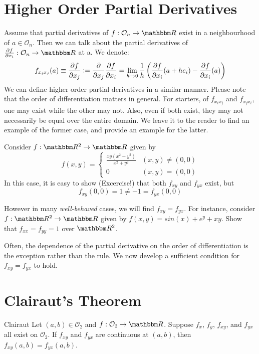 \documentclass[../Analysis-3]{subfiles}
\begin{document}
\section{Higher Order Partial Derivatives}

Assume that partial derivatives of $f: \mathcal{O}_n \to \R$ exist in a neighbourhood of $a \in \mathcal{O}_n $. Then we can talk about the partial derivatives of $\pdv{f}{x_i}: \mathcal{O}_n \to \R$ at a. We denote:
\[f_{x_i x_j}(a) \equiv \pdv{f}{x_j} \mathrel{\mathop:}= \frac{\partial}{\partial x_j} \pdv{f}{x_i} = \lim_{h \to 0} \frac{1}{h} \left( \pdv{f}{x_i}\/(a+h e_i)- \pdv{f}{x_i}\/ (a) \right) 
\]
We can define higher order partial derivatives in a similar manner. Please note that the order of differentiation matters in general. For starters, of  $f_{x_i x_j}$ and $f_{x_j x_i}$, one may exist while the other may not. Also, even if both exist, they may not necessarily be equal over the entire domain. We leave it to the reader to find an example of the former case, and provide an example for the latter.

\begin{Eg}{}{}
    Consider $f: \R^2 \to \R$ given by 
    \[
        f(x,y) = 
        \begin{cases}
        \frac{xy(x^2 - y^2)}{x^2 + y^2} & (x,y) \neq (0,0)\\
        0 & (x,y) = (0,0)
        \end{cases}
    \]
    In this case, it is easy to show (Excercise!) that both $f_{xy}$ and $f_{yx}$ exist, but 
    \[f_{xy}(0,0) = 1 \neq -1 = f_{yx}(0,0)\]
\end{Eg}

\begin{Eg}{}{}
    However in many \emph{well-behaved} cases, we will find $f_{xy} = f_{yx}$.
    For instance, consider $f: \R^2 \to \R$ given by $f(x,y) = sin(x) + e^y + xy$. Show that $f_{xx} = f_{yy} = 1$ over $\R^2$.
\end{Eg}

Often, the dependence of the partial derivative on the order of differentiation is the exception rather than the rule. We now develop a sufficient condition for $f_{xy} = f_{yx}$ to hold.

\section{Clairaut's Theorem}

\begin{Thm}{Clairaut}{}\label{thm1:19} 
    Let $(a,b) \in \mathcal{O}_2$ and $f:\mathcal{O}_2 \to \R$. Suppose $f_x$, $f_y$, $f_{xy}$, and $f_{yx}$ all exist on $\mathcal{O}_2$. If $f_{xy}$ and $f_{yx}$ are continuous at $(a,b)$, then $f_{xy}(a,b) = f_{yx}(a,b)$.
\end{Thm}
\end{document}
